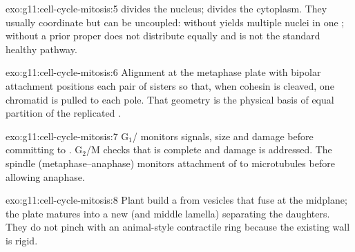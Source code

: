 \begin{solution}{exo:g11:cell-cycle-mitosis:5}
 divides the nucleus;  divides the cytoplasm. They usually
coordinate but can be uncoupled:  without  yields multiple
nuclei in one ;  without a prior proper  does not
distribute  equally and is not the standard healthy pathway.
\end{solution}

\begin{solution}{exo:g11:cell-cycle-mitosis:6}
Alignment at the metaphase plate with bipolar  attachment positions
each pair of sisters so that, when cohesin is cleaved, one chromatid is pulled
to each pole. That geometry is the physical basis of equal partition of the
replicated .
\end{solution}

\begin{solution}{exo:g11:cell-cycle-mitosis:7}
G$_1$/ monitors  signals,  size and  damage before committing to
. G$_2$/M checks that  is complete and damage is
addressed. The spindle (metaphase--anaphase)  monitors attachment of
 to microtubules before allowing anaphase.
\end{solution}

\begin{solution}{exo:g11:cell-cycle-mitosis:8}
Plant  build a  from vesicles that fuse at the midplane; the
plate matures into a new  (and middle lamella) separating the
daughters. They do not pinch with an animal-style contractile ring because the
existing wall is rigid.
\end{solution}

